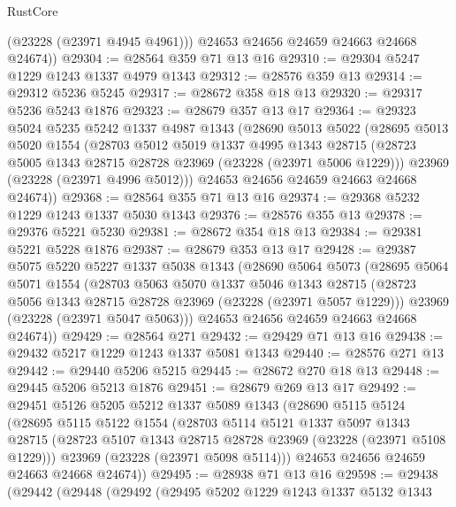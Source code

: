 \begin{lexlean}{RustCore}
\begin{coremodule}
          (@23228 (@23971 @4945 @4961)))
        @24653
        @24656
        @24659
        @24663
        @24668
        @24674))
@29304 := @28564 @359 @71 @13 @16
@29310 := @29304 @5247 @1229 @1243 @1337 @4979 @1343
@29312 := @28576 @359 @13
@29314 := @29312 @5236 @5245
@29317 := @28672 @358 @18 @13
@29320 := @29317 @5236 @5243 @1876
@29323 := @28679 @357 @13 @17
@29364 := @29323
    @5024
    @5235
    @5242
    @1337
    @4987
    @1343
    (@28690
      @5013
      @5022
      (@28695
        @5013
        @5020
        @1554
        (@28703
          @5012
          @5019
          @1337
          @4995
          @1343
          @28715
          (@28723 @5005 @1343 @28715 @28728 @23969 (@23228 (@23971 @5006 @1229)))
          @23969
          (@23228 (@23971 @4996 @5012)))
        @24653
        @24656
        @24659
        @24663
        @24668
        @24674))
@29368 := @28564 @355 @71 @13 @16
@29374 := @29368 @5232 @1229 @1243 @1337 @5030 @1343
@29376 := @28576 @355 @13
@29378 := @29376 @5221 @5230
@29381 := @28672 @354 @18 @13
@29384 := @29381 @5221 @5228 @1876
@29387 := @28679 @353 @13 @17
@29428 := @29387
    @5075
    @5220
    @5227
    @1337
    @5038
    @1343
    (@28690
      @5064
      @5073
      (@28695
        @5064
        @5071
        @1554
        (@28703
          @5063
          @5070
          @1337
          @5046
          @1343
          @28715
          (@28723 @5056 @1343 @28715 @28728 @23969 (@23228 (@23971 @5057 @1229)))
          @23969
          (@23228 (@23971 @5047 @5063)))
        @24653
        @24656
        @24659
        @24663
        @24668
        @24674))
@29429 := @28564 @271
@29432 := @29429 @71 @13 @16
@29438 := @29432 @5217 @1229 @1243 @1337 @5081 @1343
@29440 := @28576 @271 @13
@29442 := @29440 @5206 @5215
@29445 := @28672 @270 @18 @13
@29448 := @29445 @5206 @5213 @1876
@29451 := @28679 @269 @13 @17
@29492 := @29451
    @5126
    @5205
    @5212
    @1337
    @5089
    @1343
    (@28690
      @5115
      @5124
      (@28695
        @5115
        @5122
        @1554
        (@28703
          @5114
          @5121
          @1337
          @5097
          @1343
          @28715
          (@28723 @5107 @1343 @28715 @28728 @23969 (@23228 (@23971 @5108 @1229)))
          @23969
          (@23228 (@23971 @5098 @5114)))
        @24653
        @24656
        @24659
        @24663
        @24668
        @24674))
@29495 := @28938 @71 @13 @16
@29598 := @29438
    (@29442
      (@29448
        (@29492
          (@29495
            @5202
            @1229
            @1243
            @1337
            @5132
            @1343

\end{coremodule}
\end{lexlean}
